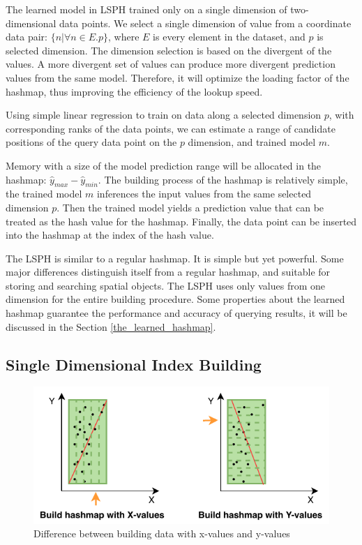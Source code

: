The learned model in LSPH trained only on a single dimension of two-dimensional data points. We select a single dimension of value from a coordinate data pair: $\{n|\forall n \in E.p\}$, where $E$ is every element in the dataset, and $p$ is selected dimension. The dimension selection is based on the  divergent of the values. A more divergent set of values can produce more divergent prediction values  from the same model. Therefore, it will optimize the loading factor of the hashmap, thus improving the efficiency of the lookup speed.

Using simple linear regression to train on data along a selected dimension $p$, with corresponding ranks of the data points, we can estimate a range of candidate positions of the query data point on the $p$ dimension, and trained model $m$. 

Memory with a size of the model prediction range will be allocated in the hashmap: $\hat{y}_{max} - \hat{y}_{min}$. The building process of the hashmap is relatively simple, the trained model $m$ inferences the input values from the same selected dimension $p$. Then the trained model yields a prediction value that can be treated as the hash value for the hashmap. Finally, the data point can be inserted into the hashmap at the index of the hash value. 

The LSPH is similar to a regular hashmap. It is simple but yet powerful. Some major differences distinguish itself from a regular hashmap, and suitable for storing and searching spatial objects. The LSPH uses only values from one dimension for the entire building procedure. Some properties about the learned hashmap guarantee the performance and accuracy of querying results, it will be discussed in the Section \ref{the_learned_hashmap}. 


\subsection{Single Dimensional Index Building}


\begin{figure}[ht]
\centering
\includegraphics{Figures/single_dimension.pdf}
\caption{Difference between building data with x-values and y-values}
\label{fig:single_dimension}
\end{figure}

